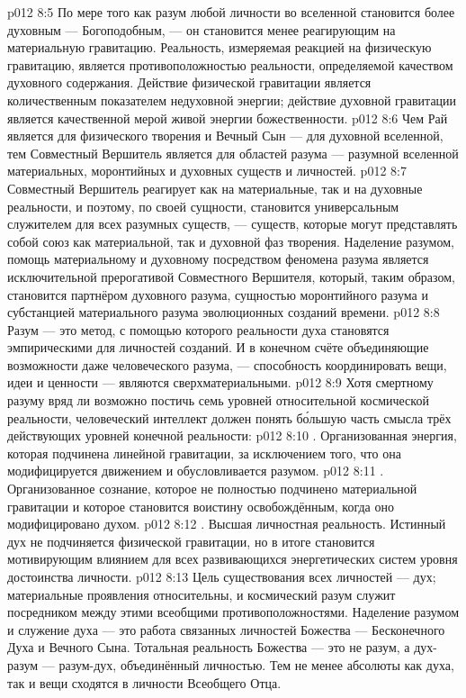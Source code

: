 \vs p012 8:5 По мере того как разум любой личности во вселенной становится более духовным --- Богоподобным, --- он становится менее реагирующим на материальную гравитацию. Реальность, измеряемая реакцией на физическую гравитацию, является противоположностью реальности, определяемой качеством духовного содержания. Действие физической гравитации является количественным показателем недуховной энергии; действие духовной гравитации является качественной мерой живой энергии божественности.
\vs p012 8:6 \pc Чем Рай является для физического творения и Вечный Сын --- для духовной вселенной, тем Совместный Вершитель является для областей разума --- разумной вселенной материальных, моронтийных и духовных существ и личностей.
\vs p012 8:7 Совместный Вершитель реагирует как на материальные, так и на духовные реальности, и поэтому, по своей сущности, становится универсальным служителем для всех разумных существ, --- существ, которые могут представлять собой союз как материальной, так и духовной фаз творения. Наделение разумом, помощь материальному и духовному посредством феномена разума является исключительной прерогативой Совместного Вершителя, который, таким образом, становится партнёром духовного разума, сущностью моронтийного разума и субстанцией материального разума эволюционных созданий времени.
\vs p012 8:8 Разум --- это метод, с помощью которого реальности духа становятся эмпирическими для личностей созданий. И в конечном счёте объединяющие возможности даже человеческого разума, --- способность координировать вещи, идеи и ценности --- являются сверхматериальными.
\vs p012 8:9 \pc Хотя смертному разуму вряд ли возможно постичь семь уровней относительной космической реальности, человеческий интеллект должен понять б\'ольшую часть смысла трёх действующих уровней конечной реальности:
\vs p012 8:10 . Организованная энергия, которая подчинена линейной гравитации, за исключением того, что она модифицируется движением и обусловливается разумом.
\vs p012 8:11 . Организованное сознание, которое не полностью подчинено материальной гравитации и которое становится воистину освобождённым, когда оно модифицировано духом.
\vs p012 8:12 . Высшая личностная реальность. Истинный дух не подчиняется физической гравитации, но в итоге становится мотивирующим влиянием для всех развивающихся энергетических систем уровня достоинства личности.
\vs p012 8:13 \pc Цель существования всех личностей --- дух; материальные проявления относительны, и космический разум служит посредником между этими всеобщими противоположностями. Наделение разумом и служение духа --- это работа связанных личностей Божества --- Бесконечного Духа и Вечного Сына. Тотальная реальность Божества --- это не разум, а дух\hyp{}разум --- разум\hyp{}дух, объединённый личностью. Тем не менее абсолюты как духа, так и вещи сходятся в личности Всеобщего Отца.
